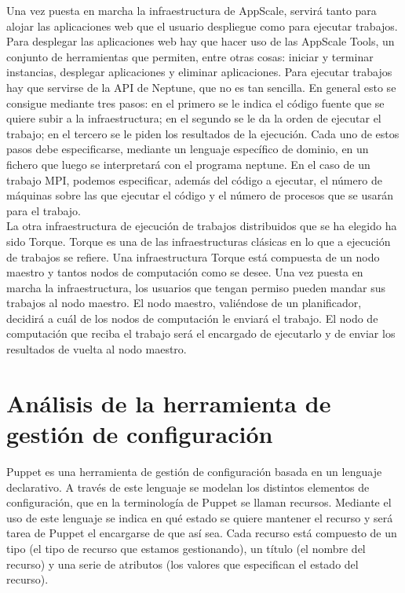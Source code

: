 Una vez puesta en marcha la infraestructura de AppScale, servirá tanto para alojar las aplicaciones web que el usuario despliegue como para ejecutar trabajos. Para desplegar las aplicaciones web hay que hacer uso de las AppScale Tools, un conjunto de herramientas que permiten, entre otras cosas: iniciar y terminar instancias, desplegar aplicaciones y eliminar aplicaciones. Para ejecutar trabajos hay que servirse de la API de Neptune, que no es tan sencilla. En general esto se consigue mediante tres pasos: en el primero se le indica el código fuente que se quiere subir a la infraestructura; en el segundo se le da la orden de ejecutar el trabajo; en el tercero se le piden los resultados de la ejecución. Cada uno de estos pasos debe especificarse, mediante un lenguaje específico de dominio, en un fichero que luego se interpretará con el programa neptune. En el caso de un trabajo MPI, podemos especificar, además del código a ejecutar, el número de máquinas sobre las que ejecutar el código y el número de procesos que se usarán para el trabajo.\\

La otra infraestructura de ejecución de trabajos distribuidos que se ha elegido ha sido Torque. Torque es una de las infraestructuras clásicas en lo que a ejecución de trabajos se refiere. Una infraestructura Torque está compuesta de un nodo maestro y tantos nodos de computación como se desee. Una vez puesta en marcha la infraestructura, los usuarios que tengan permiso pueden mandar sus trabajos al nodo maestro. El nodo maestro, valiéndose de un planificador, decidirá a cuál de los nodos de computación le enviará el trabajo. El nodo de computación que reciba el trabajo será el encargado de ejecutarlo y de enviar los resultados de vuelta al nodo maestro.


\section{Análisis de la herramienta de gestión de configuración}

Puppet es una herramienta de gestión de configuración basada en un lenguaje declarativo. A través de este lenguaje se modelan los distintos elementos de configuración, que en la terminología de Puppet se llaman recursos. Mediante el uso de este lenguaje se indica en qué estado se quiere mantener el recurso y será tarea de Puppet el encargarse de que así sea. Cada recurso está compuesto de un tipo (el tipo de recurso que estamos gestionando), un título (el nombre del recurso) y una serie de atributos (los valores que especifican el estado del recurso). 


